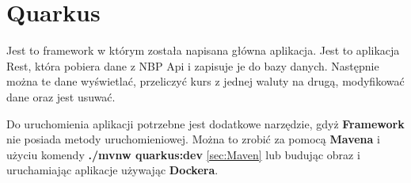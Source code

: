 \documentclass{iiuwb}
\begin{document}
\section{Quarkus}
\label{sec:Quarkus}

Jest to framework w którym została napisana główna aplikacja. Jest to aplikacja Rest, która pobiera dane z NBP Api i zapisuje je do bazy danych. Następnie można te dane wyświetlać, przeliczyć kurs z jednej waluty na drugą, modyfikować dane oraz jest usuwać.

Do uruchomienia aplikacji potrzebne jest dodatkowe narzędzie, gdyż \textbf{Framework} nie posiada metody uruchomieniowej. Można to zrobić za pomocą \textbf{Mavena} i użyciu komendy  \textbf{./mvnw quarkus:dev
} \ref{sec:Maven} lub budując obraz i uruchamiając aplikacje używając \textbf{Dockera}.\newline
\end{document}
